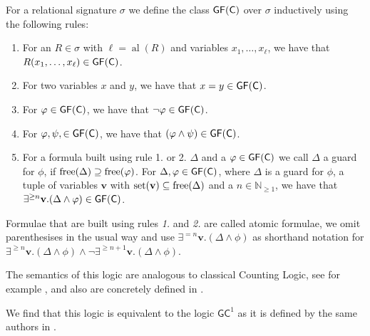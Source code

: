 \begin{definition}
	For a relational signature $\sigma$ we define the class $\mathsf{GF}(\mathsf{C})$ over $\sigma$ inductively using the following rules:
	\begin{enumerate}
		\item For an $R\in\sigma$ with $\ell=\operatorname{al}(R)$ and variables $x_1,\dots,x_\ell$, we have that $R(x_1,\dots,x_\ell)\in \mathsf{GF}(\mathsf{C})$.
		\item For two variables $x$ and $y$, we have that $x=y\in\mathsf{GF}(\mathsf{C})$.
		\item For $\varphi\in\mathsf{GF}(\mathsf{C})$, we have that $\neg\varphi\in\mathsf{GF}(\mathsf{C})$.
		\item For $\varphi,\psi,\in\mathsf{GF}(\mathsf{C})$, we have that $(\varphi\land\psi)\in\mathsf{GF}(\mathsf{C})$.
		\item For a formula built using rule 1. or 2. $\Delta$ and a $\varphi\in\mathsf{GF}(\mathsf{C})$ we call $\Delta$ a guard for $\phi$, if $\operatorname{free}(\Delta)\supseteq\operatorname{free}(\varphi)$.
		For $\Delta,\varphi\in \mathsf{GF}(\mathsf{C})$, where $\Delta$ is a guard for $\phi$, a tuple of variables $\mathbf v$ with $\operatorname{set}(\mathbf v)\subseteq \operatorname{free}(\Delta)$ and a $n\in \mathbb N_{\geq 1}$, we have that $\exists^{\geq n}\mathbf v . (\Delta \land \varphi)\in \mathsf{GF}(\mathsf{C})$.
	\end{enumerate}
	Formulae that are built using rules \emph{1.} and \emph{2.} are called atomic formulae, we omit parenthesises in the usual way and use $\exists^{=n}\mathbf v.(\Delta\land\phi)$ as shorthand notation for $\exists^{\geq n}\mathbf v.(\Delta\land\phi)\land \neg\exists^{\geq n+1}\mathbf v.(\Delta\land\phi)$.
	
	The semantics of this logic are analogous to classical Counting Logic, see for example \cite{cai1992OptimalLower}, and also are concretely defined in \cite{scheidt2025ColorRefinement}.
\end{definition}
We find that this logic is equivalent to the logic $\mathsf{GC}^1$ as it is defined by the same authors in \cite{scheidt2023CountingHomomorphisms}.

